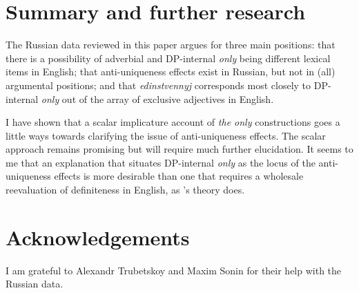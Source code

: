 \documentclass{article}
\begin{document}
\section{Summary and further research \label{sec:conclusion}}
The Russian data reviewed in this paper argues for three main positions: that there is a possibility of adverbial and DP-internal \textit{only} being different lexical items in English; that anti-uniqueness effects exist in Russian, but not in (all) argumental positions; and that \textit{edinstvennyj} corresponds most closely to DP-internal \textit{only} out of the array of exclusive adjectives in English.

I have shown that a scalar implicature account of \textit{the only} constructions goes a little ways towards clarifying the issue of anti-uniqueness effects. The scalar approach remains promising but will require much further elucidation. It seems to me that an explanation that situates DP-internal \textit{only} as the locus of the anti-uniqueness effects is more desirable than one that requires a wholesale reevaluation of definiteness in English, as \citeauthor{cb2015}'s theory does.



\section*{Acknowledgements}
I am grateful to Alexandr Trubetskoy and Maxim Sonin for their help with the Russian data.




\end{document}
